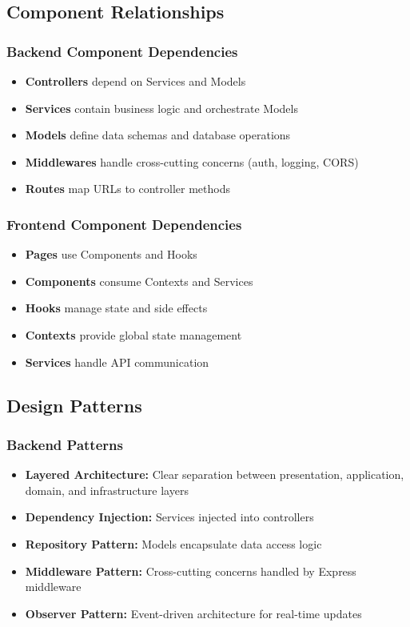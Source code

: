 \subsection{Component Relationships}

\subsubsection{Backend Component Dependencies}
\begin{itemize}
\item \textbf{Controllers} depend on Services and Models
\item \textbf{Services} contain business logic and orchestrate Models
\item \textbf{Models} define data schemas and database operations
\item \textbf{Middlewares} handle cross-cutting concerns (auth, logging, CORS)
\item \textbf{Routes} map URLs to controller methods
\end{itemize}

\subsubsection{Frontend Component Dependencies}
\begin{itemize}
\item \textbf{Pages} use Components and Hooks
\item \textbf{Components} consume Contexts and Services
\item \textbf{Hooks} manage state and side effects
\item \textbf{Contexts} provide global state management
\item \textbf{Services} handle API communication
\end{itemize}

\subsection{Design Patterns}

\subsubsection{Backend Patterns}
\begin{itemize}
\item \textbf{Layered Architecture:} Clear separation between presentation, application, domain, and infrastructure layers
\item \textbf{Dependency Injection:} Services injected into controllers
\item \textbf{Repository Pattern:} Models encapsulate data access logic
\item \textbf{Middleware Pattern:} Cross-cutting concerns handled by Express middleware
\item \textbf{Observer Pattern:} Event-driven architecture for real-time updates
\end{itemize}

